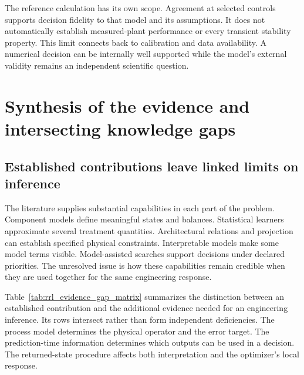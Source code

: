 The reference calculation has its own scope. Agreement at selected controls supports decision fidelity to that model and its assumptions. It does not automatically establish measured-plant performance or every transient stability property. This limit connects back to calibration and data availability. A numerical decision can be internally well supported while the model's external validity remains an independent scientific question.

\section{Synthesis of the evidence and intersecting knowledge gaps}

\subsection{Established contributions leave linked limits on inference}

The literature supplies substantial capabilities in each part of the problem. Component models define meaningful states and balances. Statistical learners approximate several treatment quantities. Architectural relations and projection can establish specified physical constraints. Interpretable models make some model terms visible. Model-assisted searches support decisions under declared priorities. The unresolved issue is how these capabilities remain credible when they are used together for the same engineering response.

Table~\ref{tab:rrl_evidence_gap_matrix} summarizes the distinction between an established contribution and the additional evidence needed for an engineering inference. Its rows intersect rather than form independent deficiencies. The process model determines the physical operator and the error target. The prediction-time information determines which outputs can be used in a decision. The returned-state procedure affects both interpretation and the optimizer's local response.

